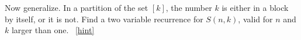 \documentclass{book}
\begin{document}
\setcounter{project}{200}
\addtocounter{project}{-1}
\begin{activity}[]\label{secondstirlingrecurrence}
\hypertarget{p-1129}{}%
Now generalize.  In a partition of the set \([k]\), the number \(k\) is either in a block by itself, or it is not.  Find a two variable recurrence for \(S(n,k)\), valid for \(n\) and \(k\) larger than one.%
~\hfill{\tiny\hyperlink{a-200}{[hint]}\hypertarget{q-200}{}}\end{activity}
\end{document}

